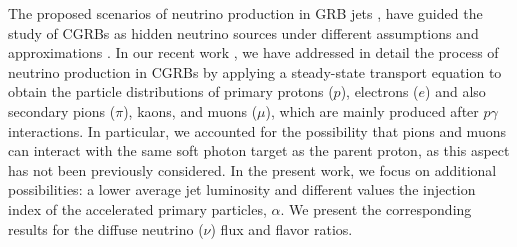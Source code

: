 \documentclass[baaa]{baaa}
\begin{document}
 The proposed scenarios of neutrino production in GRB jets \citep[e.g.,][]{waxman1997}, have guided the study of CGRBs as hidden neutrino sources under different assumptions and approximations \citep{murase2013,senno2016,he2018,fasano2021}. %
 In our recent work \citep[][RD2023]{reynoso2023}, we have addressed in detail the process of neutrino production in CGRBs by applying a steady-state transport equation to obtain the particle distributions of primary protons ($p$), electrons ($e$) and also secondary pions ($\pi$), kaons, and muons ($\mu$), which are mainly produced after $p\gamma$ interactions. In particular, we accounted for the possibility that pions and muons can interact with the same soft photon target as the parent proton, as this aspect has not been previously considered.
 In the present work, we focus on additional possibilities: a lower average jet luminosity and different values the injection index of the accelerated primary particles, $\alpha$. We present the corresponding results for the diffuse neutrino ($\nu$) flux and flavor ratios. 
   
\end{document}
